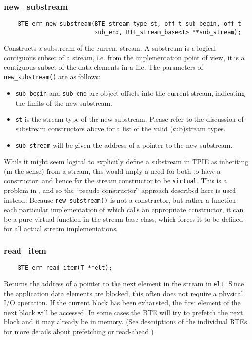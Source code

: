 \subsubsection{new\_substream}
\begin{lstlisting}
    BTE_err new_substream(BTE_stream_type st, off_t sub_begin, off_t
                          sub_end, BTE_stream_base<T> **sub_stream);
\end{lstlisting}

Constructs a substream of the current stream.  A substream
is a logical contiguous subset of a stream, i.e. from the
implementation point of view, it is a contiguous subset of
the data elements in a file.  The parameters of
\lstinline|new_substream()| are as follows:
\begin{itemize}
    \item \lstinline|sub_begin| and \lstinline|sub_end| are
    object offsets into the current stream, indicating the
    limits of the new substream.
    
    \item \lstinline|st| is the stream type of the new
    substream. Please refer to the discussion of substream
    constructors above for a list of the valid (sub)stream
    types.

    \item \lstinline|sub_stream| will be given the address of
    a pointer to the new substream.
\end{itemize}

While it might seem logical to explicitly define a substream
in TPIE as inheriting (in the \CPP{} sense) from a stream, this
would imply a need for both to have a constructor, and hence
for the stream constructor to be \lstinline|virtual|. This is a
problem in \CPP{}, and so the ``pseudo-constructor'' approach
described here is used instead.
Because \lstinline|new_substream()| is not a constructor, but rather a
function each particular implementation of which calls an appropriate
constructor, it can be a pure virtual function in the stream base class,
which forces it to be defined for all actual stream
implementations.

\subsubsection{read\_item}
\begin{lstlisting}
    BTE_err read_item(T **elt);
\end{lstlisting}
Returns the address of a pointer to the next element in the
stream in \lstinline|elt|. Since the application data elements are blocked,
this often does not require a physical I/O operation. If the
current block has been exhausted, the first element of the
next block will be accessed. In some cases the BTE will
try to prefetch the next block and it may already be in
memory. (See descriptions of the individual BTEs for more
details about prefetching or read-ahead.)

